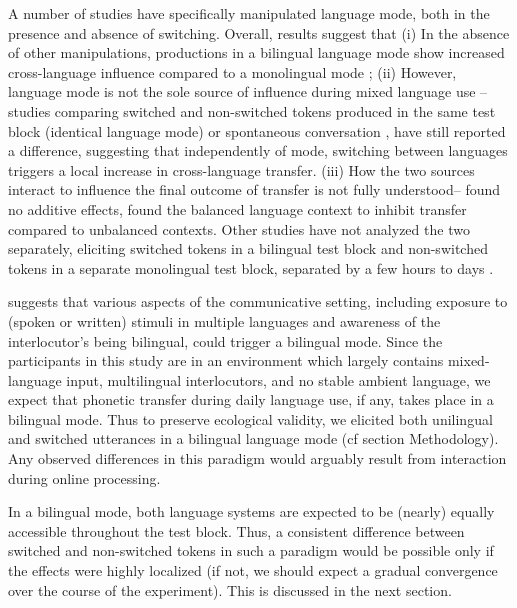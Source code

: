 \documentclass[charis,linguex]{glossa}
\begin{document}
A number of studies have specifically manipulated language mode, both in the presence and absence of switching. Overall, results suggest that (i) In the absence of other manipulations, productions in a bilingual language mode show increased cross-language influence compared to a monolingual mode \citep{simonet2020increased,simonet2014phonetic}; (ii) However, language mode is not the sole source of influence during mixed language use -- studies comparing switched and non-switched tokens produced in the same test block (identical language mode) \citep{olson2016role,tsui2019impact} or spontaneous conversation \citep{piccinini2015voice}, have still reported a difference, suggesting that independently of mode, switching between languages triggers a local increase in cross-language transfer. (iii) How the two sources interact to influence the final outcome of transfer is not fully understood-- \cite{olson2016role} found no additive effects, \cite{olson2013bilingual} found the balanced language context to inhibit transfer compared to unbalanced contexts.  Other studies have not analyzed the two separately, eliciting switched tokens in a bilingual test block and non-switched tokens in a separate monolingual test block, separated by a few hours to days \cite{Pschwartz2015language, bullock2009trying,antoniou2011inter, elias2017effects,vsimavckova2015immediate,vsimavckova2018patterns}.

\cite{grosjean1998studying} suggests that various aspects of the communicative setting, including exposure to (spoken or written) stimuli in multiple languages and awareness of the interlocutor's being bilingual, could trigger a bilingual mode. Since the participants in this study are in an environment which largely contains mixed-language input, multilingual interlocutors, and no stable ambient language, we expect that phonetic transfer during daily language use, if any, takes place in a bilingual mode.  Thus to preserve ecological validity, we elicited both unilingual and switched utterances in a bilingual language mode (cf section Methodology). Any observed differences in this paradigm would arguably result from interaction during online processing. 

In a bilingual mode, both language systems are expected to be (nearly) equally accessible throughout the test block. Thus, a consistent difference between switched and non-switched tokens in such a paradigm would be possible only if the effects were highly localized (if not, we should expect a gradual convergence over the course of the experiment). This is discussed in the next section.
\end{document}
